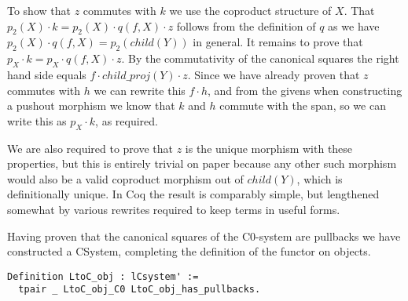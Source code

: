 To show that $z$ commutes with $k$ we use the coproduct structure of $X$. That
$p_2(X)\cdot k = p_2(X)\cdot q(f, X)\cdot z$ follows from the definition of $q$
as we have $p_2(X)\cdot q(f, X) = p_2(child(Y))$ in general. It remains to prove
that $p_X\cdot k = p_X\cdot q(f, X)\cdot z$. By the commutativity of the
canonical squares the right hand side equals $f\cdot child\_proj(Y)\cdot z$.
Since we have already proven that $z$ commutes with $h$ we can rewrite this
$f\cdot h$, and from the givens when constructing a pushout morphism we know
that $k$ and $h$ commute with the span, so we can write this as $p_X\cdot k$, as
required.

We are also required to prove that $z$ is the unique morphism with these
properties, but this is entirely trivial on paper because any other such
morphism would also be a valid coproduct morphism out of $child(Y)$, which is
definitionally unique. In Coq the result is comparably simple, but lengthened
somewhat by various rewrites required to keep terms in useful forms.

Having proven that the canonical squares of the C0-system are pullbacks we have
constructed a CSystem, completing the definition of the functor on objects.
\begin{lstlisting}
Definition LtoC_obj : lCsystem' := 
  tpair _ LtoC_obj_C0 LtoC_obj_has_pullbacks.
\end{lstlisting}